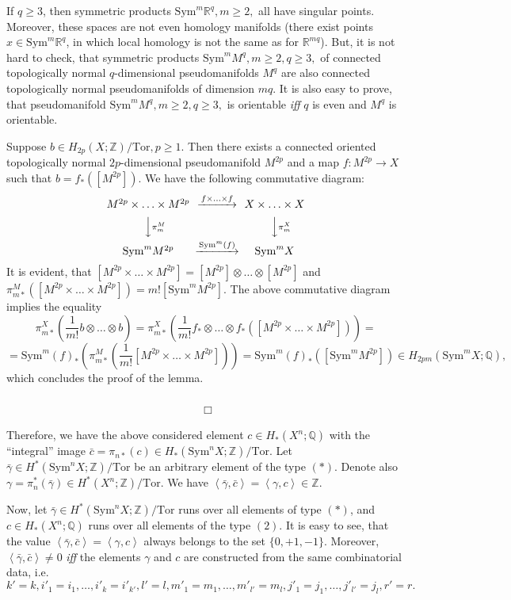 \documentclass[a4paper,14pt]{article}
\newcommand{\Sym}{\mathrm{Sym}}
\newcommand{\Tor}{\mathrm{Tor}}
\newcommand{\Q}{\mathbb{Q}}
\newcommand{\R}{\mathbb{R}}
\newcommand{\Z}{\mathbb{Z}}
\begin{document}
If $q\ge 3$, then symmetric products $\Sym^m \R^q, m\ge 2,$ all have singular points. Moreover, these spaces are not even homology manifolds (there exist points $x\in \Sym^m \R^q$, in which local homology is not the same as for $\R^{mq}$). But, it is not hard to check, that symmetric products $\Sym^m M^q, m\ge 2, q\ge 3,$ of connected topologically normal $q$-dimensional pseudomanifolds $M^q$ are also connected topologically normal pseudomanifolds of dimension $mq$. It is also easy to prove, that pseudomanifold $\Sym^m M^q, m\ge 2, q\ge 3,$ is orientable {\it iff} $q$ is even and $M^q$ is orientable. 

Suppose $b\in H_{2p}(X;\Z)/\Tor, p\ge 1.$ Then there exists a connected oriented topologically normal $2p$-dimensional pseudomanifold $M^{2p}$ and a map $f:M^{2p}\to X$ such that $b=f_*([M^{2p}])$. We have the following commutative diagram:
$$
\begin{CD}
M^{2p}\times\ldots\times M^{2p}  @>f\times\ldots\times f>>  X \times \ldots \times X \\
@VV\pi_m^{M}V   @VV\pi_m^XV  \\
\Sym^m M^{2p} @>\Sym^m(f)>> \Sym^m X
\end{CD}
$$
It is evident, that $[M^{2p}\times\ldots\times M^{2p}] = [M^{2p}]\otimes\ldots\otimes [M^{2p}]$ and $\pi_{m*}^M([M^{2p}\times\ldots\times M^{2p}]) = m! [\Sym^m M^{2p}]$. 
The above commutative diagram implies the equality
$$
\pi_{m*}^X (\frac{1}{m!} b\otimes \ldots \otimes b)  =  \pi_{m*}^X (\frac{1}{m!} f_*\otimes\ldots\otimes f_* ([M^{2p}\times\ldots\times M^{2p}])) =
$$
$$
= \Sym^m(f)_* ( \pi_{m*}^M  ( \frac{1}{m!} [M^{2p}\times\ldots\times M^{2p}])  ) = \Sym^m(f)_* ( [\Sym^m M^{2p}] ) \in H_{2pm}(\Sym^m X;\Q),
$$
which concludes the proof of the lemma. \  \  \ \ \ \ \ \ \ \ \ \ \ \ \ \ \ \ \ \ \ \ \ \ \ \ \ \ \ \ \ \ \ \ \ \ \ \ \ \ \ \ \ \ \ \ \ \ \ \ \ \ \ \ \ \ \ \ \ \ \ \ \ \ \ \ \ \ \ \ \ \ \ \ \ \ \ \ \ \ \ \ \ \ \ \ \ \ \ \ \ \ \ \ \ \ \ \ \ \ \ \ \ \ \ \ \ $\Box$

Therefore, we have the above considered element $c\in H_*(X^n;\Q)$ with the ``integral'' image $\bar{c}=\pi_{n*}(c)\in H_*(\Sym^n X;\Z)/\Tor$. Let $\bar{\gamma}\in H^*(\Sym^n X;\Z)/\Tor$ be an arbitrary element of the type $(*)$. Denote also $\gamma=\pi_{n}^*(\bar{\gamma})\in H^*(X^n;\Z)/\Tor$. We have $\left< \bar{\gamma}, \bar{c} \right> = \left< \gamma, c \right>\in \Z$.

Now, let $\bar{\gamma}\in H^*(\Sym^n X;\Z)/\Tor$ runs over all elements of type $(*)$, and $c\in H_*(X^n;\Q)$ runs over all elements of the type $(2)$. It is easy to see, that the value $\left< \bar{\gamma}, \bar{c} \right> = \left< \gamma, c \right>$ always belongs to the set $\{0,+1,-1\}$. Moreover, $\left< \bar{\gamma}, \bar{c} \right> \ne 0$ {\it iff} the elements $\gamma$ and $c$ are constructed from the same combinatorial data, i.e. 
$$
k'=k, i'_1=i_1,\ldots,i'_k=i'_{k'}, l'=l, m'_1=m_1,\ldots,m'_{l'}=m_l, j'_1=j_1, \ldots, j'_{l'}=j_l, r'=r.
$$ 
\end{document}
